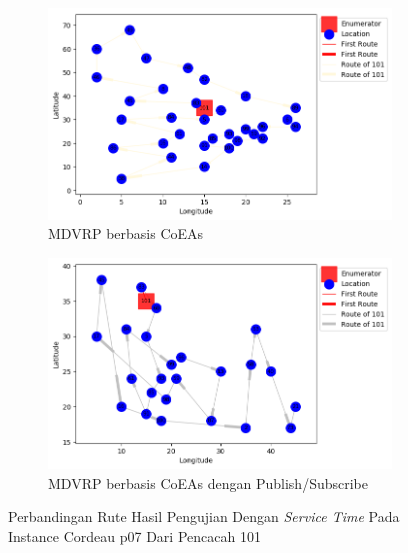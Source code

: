 \begin{figure}[H]
	\centering
	\begin{subfigure}[t]{\textwidth}
		\centering
		\includegraphics[width=\textwidth]{Resources/Images/cordeau_p07_tw/cordeau_p07_tw_101_coes}
		\caption{MDVRP berbasis CoEAs}
		\label{fig:cordeau_p07_tw_101_coes}
	\end{subfigure}
	\begin{subfigure}[t]{\textwidth}
		\centering
		\includegraphics[width=\textwidth]{Resources/Images/cordeau_p07_tw/cordeau_p07_tw_101_pubsub_coes}
		\caption{MDVRP berbasis CoEAs dengan Publish/Subscribe}
		\label{fig:cordeau_p07_tw_101_pubsub_coes}
	\end{subfigure}
	\caption{Perbandingan Rute Hasil Pengujian Dengan \textit{Service Time} Pada Instance Cordeau p07 Dari Pencacah 101}
	\label{fig:cordeau_p07_tw_101}
\end{figure}


